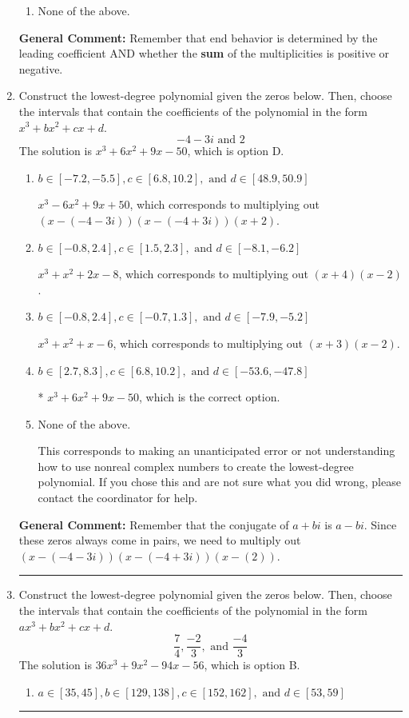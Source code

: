 \documentclass{extbook}[14pt]
\newcommand{\litem}[1]{\item #1

\rule{\textwidth}{0.4pt}}
\begin{document}
\begin{enumerate}
{\begin{enumerate}[label=\Alph*.]
\begin{multicols}{2}
\end{multicols}\item None of the above.\end{enumerate}
\textbf{General Comment:} Remember that end behavior is determined by the leading coefficient AND whether the \textbf{sum} of the multiplicities is positive or negative.
}
\litem{
Construct the lowest-degree polynomial given the zeros below. Then, choose the intervals that contain the coefficients of the polynomial in the form $x^3+bx^2+cx+d$.
\[ -4 - 3 i \text{ and } 2 \]The solution is \( x^{3} +6 x^{2} +9 x -50 \), which is option D.\begin{enumerate}[label=\Alph*.]
\item \( b \in [-7.2, -5.5], c \in [6.8, 10.2], \text{ and } d \in [48.9, 50.9] \)

$x^{3} -6 x^{2} +9 x + 50$, which corresponds to multiplying out $(x-(-4 - 3 i))(x-(-4 + 3 i))(x + 2)$.
\item \( b \in [-0.8, 2.4], c \in [1.5, 2.3], \text{ and } d \in [-8.1, -6.2] \)

$x^{3} + x^{2} +2 x -8$, which corresponds to multiplying out $(x + 4)(x -2)$.
\item \( b \in [-0.8, 2.4], c \in [-0.7, 1.3], \text{ and } d \in [-7.9, -5.2] \)

$x^{3} + x^{2} +x -6$, which corresponds to multiplying out $(x + 3)(x -2)$.
\item \( b \in [2.7, 8.3], c \in [6.8, 10.2], \text{ and } d \in [-53.6, -47.8] \)

* $x^{3} +6 x^{2} +9 x -50$, which is the correct option.
\item \( \text{None of the above.} \)

This corresponds to making an unanticipated error or not understanding how to use nonreal complex numbers to create the lowest-degree polynomial. If you chose this and are not sure what you did wrong, please contact the coordinator for help.
\end{enumerate}

\textbf{General Comment:} Remember that the conjugate of $a+bi$ is $a-bi$. Since these zeros always come in pairs, we need to multiply out $(x-(-4 - 3 i))(x-(-4 + 3 i))(x-(2))$.
}
\litem{
Construct the lowest-degree polynomial given the zeros below. Then, choose the intervals that contain the coefficients of the polynomial in the form $ax^3+bx^2+cx+d$.
\[ \frac{7}{4}, \frac{-2}{3}, \text{ and } \frac{-4}{3} \]The solution is \( 36x^{3} +9 x^{2} -94 x -56 \), which is option B.\begin{enumerate}[label=\Alph*.]
\item \( a \in [35, 45], b \in [129, 138], c \in [152, 162], \text{ and } d \in [53, 59] \)


\end{enumerate}}
\end{enumerate}
\end{document}
